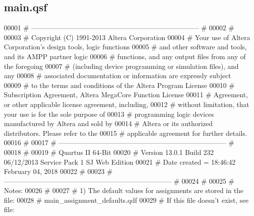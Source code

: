 \subsection{main.\+qsf}
\label{main_8qsf_source}

\begin{DoxyCode}
00001 \textcolor{keyword}{# -------------------------------------------------------------------------- #}
00002 \textcolor{keyword}{#}
00003 \textcolor{keyword}{# Copyright (C) 1991-2013 Altera Corporation}
00004 \textcolor{keyword}{# Your use of Altera Corporation's design tools, logic functions }
00005 \textcolor{keyword}{# and other software and tools, and its AMPP partner logic }
00006 \textcolor{keyword}{# functions, and any output files from any of the foregoing }
00007 \textcolor{keyword}{# (including device programming or simulation files), and any }
00008 \textcolor{keyword}{# associated documentation or information are expressly subject }
00009 \textcolor{keyword}{# to the terms and conditions of the Altera Program License }
00010 \textcolor{keyword}{# Subscription Agreement, Altera MegaCore Function License }
00011 \textcolor{keyword}{# Agreement, or other applicable license agreement, including, }
00012 \textcolor{keyword}{# without limitation, that your use is for the sole purpose of }
00013 \textcolor{keyword}{# programming logic devices manufactured by Altera and sold by }
00014 \textcolor{keyword}{# Altera or its authorized distributors.  Please refer to the }
00015 \textcolor{keyword}{# applicable agreement for further details.}
00016 \textcolor{keyword}{#}
00017 \textcolor{keyword}{# -------------------------------------------------------------------------- #}
00018 \textcolor{keyword}{#}
00019 \textcolor{keyword}{# Quartus II 64-Bit}
00020 \textcolor{keyword}{# Version 13.0.1 Build 232 06/12/2013 Service Pack 1 SJ Web Edition}
00021 \textcolor{keyword}{# Date created = 18:46:42  February 04, 2018}
00022 \textcolor{keyword}{#}
00023 \textcolor{keyword}{# -------------------------------------------------------------------------- #}
00024 \textcolor{keyword}{#}
00025 \textcolor{keyword}{# Notes:}
00026 \textcolor{keyword}{#}
00027 \textcolor{keyword}{# 1) The default values for assignments are stored in the file:}
00028 \textcolor{keyword}{#       main\_assignment\_defaults.qdf}
00029 \textcolor{keyword}{#    If this file doesn't exist, see file:}

\end{DoxyCode}
